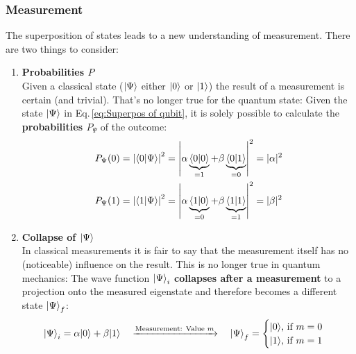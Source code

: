\documentclass[bibliography=totocnumbered]{article}
\theoremstyle{NoticeStyle}
\begin{document}
\subsubsection{Measurement}
The superposition of states leads to a new understanding of measurement. There are two things to consider:
\begin{enumerate}
	\item \textbf{Probabilities $P$}\\
	Given a classical state (${\left\vert{\Psi}\right\rangle}$ either ${\left\vert{0}\right\rangle}$ or ${\left\vert{1}\right\rangle}$) the result of a measurement is certain (and trivial). That's no longer true for the quantum state: Given the state ${\left\vert{\Psi}\right\rangle}$ in Eq.\,\ref{eq:Superpos of qubit}, it is solely possible to calculate the \textbf{probabilities $P_\Psi$} of the outcome:
	\begin{align}
		P_\Psi(0) = \left|\braket{0}{\Psi}\right|^2 &= \left|   \alpha \underbrace{\braket{0}{0}}_{=1} + \beta \underbrace{\braket{0}{1}}_{=0}   \right|^2 = |\alpha|^2\\
		P_\Psi(1) = \left|\braket{1}{\Psi}\right|^2 &= \left|   \alpha \underbrace{\braket{1}{0}}_{=0} + \beta \underbrace{\braket{1}{1}}_{=1}   \right|^2 = |\beta|^2
	\end{align}
	
	\item \textbf{Collapse of ${\left\vert{\Psi}\right\rangle}$}\\
	In classical measurements it is fair to say that the measurement itself has no (noticeable) influence on the result. This is no longer true in quantum mechanics: The wave function ${\left\vert{\Psi}\right\rangle}_i$ \textbf{collapses after a measurement} to a projection onto the measured eigenstate and therefore becomes a different state ${\left\vert{\Psi}\right\rangle}_f$:
	\begin{align}
		{\left\vert{\Psi}\right\rangle}_i = \alpha {\left\vert{0}\right\rangle} + \beta {\left\vert{1}\right\rangle}
		\quad
		\xrightarrow{\text{Measurement:  Value } m}
		\quad
		{\left\vert{\Psi}\right\rangle}_f=
		\begin{cases}
			{\left\vert{0}\right\rangle} \text{,  if } m=0\\
			{\left\vert{1}\right\rangle} \text{,  if } m=1
		\end{cases}
	\end{align}

\end{enumerate}
\end{document}
